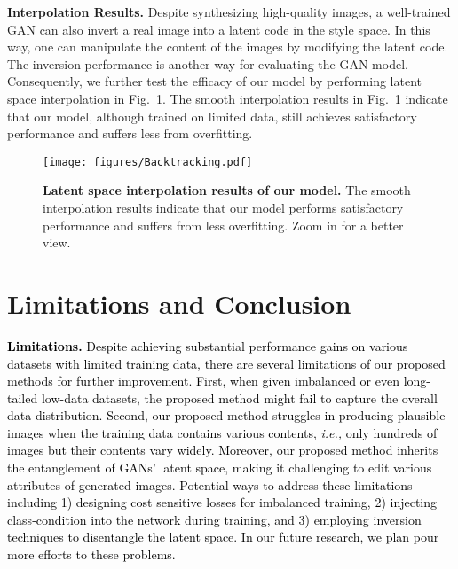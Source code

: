 \documentclass[10pt,journal,compsoc]{IEEEtran}
\newcommand{\revise}[1]{\textcolor{black}{#1}}
\begin{document}
\textbf{Interpolation Results.} Despite synthesizing high-quality images, a well-trained GAN can also invert a real image into a latent code in the style space.
In this way, one can manipulate the content of the images by modifying the latent code.
The inversion performance is another way for evaluating the GAN model.
Consequently, we further test the efficacy of our model by performing latent space interpolation in Fig.~\ref{Backtracking}.
The smooth interpolation results in Fig.~\ref{Backtracking} indicate that our model, although trained on limited data, still achieves satisfactory performance and suffers less from overfitting.
\begin{figure}
  \vspace{-2mm}
  \centering
  \texttt{[image: figures/Backtracking.pdf]}
  \caption{\textbf{Latent space interpolation results of our model.} The smooth interpolation results indicate that our model performs satisfactory performance and suffers from less overfitting.
  Zoom in for a better view.
  }
  \label{Backtracking}
  \vspace{-1mm}
\end{figure}

\section{Limitations and Conclusion}

\revise{\textbf{Limitations.}
%
Despite achieving substantial performance gains on various datasets with limited training data, there are several limitations of our proposed methods for further improvement.
%
First, when given imbalanced or even long-tailed low-data datasets, the proposed method might fail to capture the overall data distribution.
%
Second, our proposed method struggles in producing plausible images when the training data contains various contents, \emph{i.e.,} only hundreds of images but their contents vary widely.
%
Moreover, our proposed method inherits the entanglement of GANs' latent space, making it challenging to edit various attributes of generated images.
%
Potential ways to address these limitations including 1) designing cost sensitive losses for imbalanced training, 2) injecting class-condition into the network during training, and 3) employing inversion techniques to disentangle the latent space.
%
In our future research, we plan pour more efforts to these problems.
}
%
\end{document}
